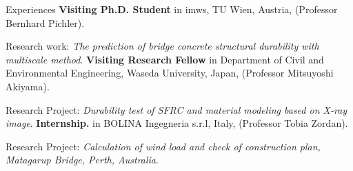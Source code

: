 \begin{rubric}{Experiences}
%
	\textbf{Visiting Ph.D. Student} in imws, TU Wien, Austria, (Professor Bernhard Pichler).
	\par Research work: \emph{The prediction of bridge concrete structural durability with multiscale method}.
%
%
\entry*[2019 -- 2020]%
	\textbf{Visiting Research Fellow} in Department of Civil and Environmental Engineering, Waseda University, Japan, (Professor Mitsuyoshi Akiyama).
	\par Research Project: \emph{Durability test of SFRC and material modeling based on X-ray image}.
% 
\entry*[2016 -- 2016]%
	\textbf{Internship.} in BOLINA Ingegneria s.r.l, Italy, (Professor Tobia Zordan).
	\par Research Project: \emph{Calculation of wind load and check of construction plan, Matagarup
	Bridge, Perth, Australia}.
%
\end{rubric}